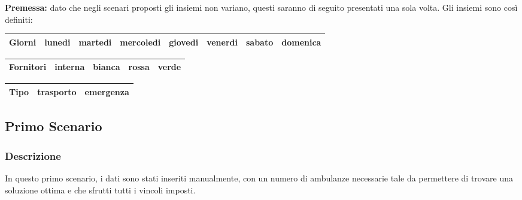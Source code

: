 \textbf{Premessa: } dato che negli scenari proposti gli insiemi non variano, questi saranno di seguito presentati una sola volta.
Gli insiemi sono così definiti: \newline \vspace*{0.1 cm} \newline
\begin{tabular}{|| c || c c c c c c c ||}
    \hline
    Giorni & lunedi & martedi & mercoledi & giovedi & venerdi & sabato & domenica \\ 
    \hline
\end{tabular}
\newline
\vspace*{0.3 cm}
\newline
\begin{tabular}{|| c || c c c c ||}
    \hline
        Fornitori & interna & bianca & rossa & verde \\
    \hline
\end{tabular}
\newline
\vspace*{0.3 cm}
\newline
\begin{tabular}{|| c || c c ||}
    \hline
        Tipo & trasporto & emergenza \\
    \hline
\end{tabular}

\subsection{Primo Scenario}
\subsubsection{Descrizione}
In questo primo scenario, i dati sono stati inseriti manualmente, con un numero di ambulanze necessarie tale da permettere di trovare una soluzione ottima e che sfrutti tutti i vincoli imposti.
